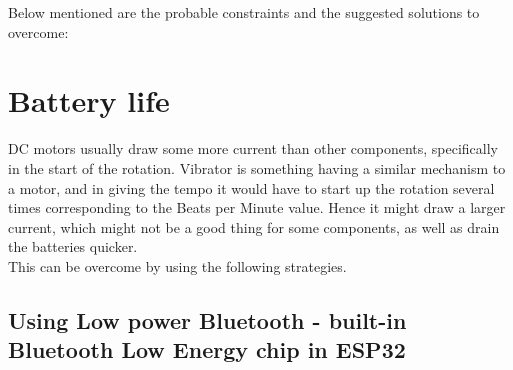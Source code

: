\documentclass{article}
\begin{document}
        Below mentioned are the probable constraints and the suggested solutions to overcome:
        
        \section{Battery life}
        DC motors usually draw some more current than other components, specifically in the start of the rotation. Vibrator is something having a similar mechanism to a motor, and in giving the tempo it would have to start up the rotation several times corresponding to the Beats per Minute value. Hence it might draw a larger current, which might not be a good thing for some components, as well as drain the batteries quicker.\\
        
        This can be overcome by using the following strategies. 

        \subsection{Using Low power Bluetooth - built-in Bluetooth Low Energy chip in ESP32}

        \begin{figure}[!htb]
                \centering
            \end{figure}
\end{document}
